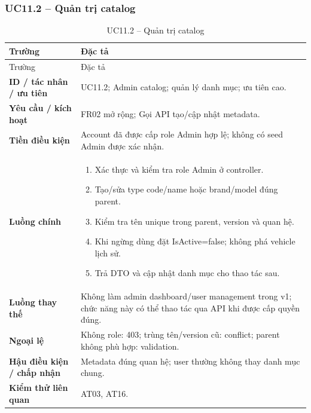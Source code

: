 \subsubsection{UC11.2 -- Quản trị catalog}\label{uc:UC11.2}
\begin{smalltable}\begin{longtable}{L{3.2cm}L{11.8cm}}
\caption{UC11.2 -- Quản trị catalog}\label{tab:UC11.2}\\
\toprule Trường & Đặc tả\\\midrule\endfirsthead
\toprule Trường & Đặc tả\\\midrule\endhead
\textbf{ID / tác nhân / ưu tiên} & UC11.2; Admin catalog; quản lý danh mục; ưu tiên cao.\\
\textbf{Yêu cầu / kích hoạt} & FR02 mở rộng; Gọi API tạo/cập nhật metadata.\\
\textbf{Tiền điều kiện} & Account đã được cấp role Admin hợp lệ; không có seed Admin được xác nhận.\\
\textbf{Luồng chính} & \begin{enumerate}[leftmargin=*,nosep]
\item Xác thực và kiểm tra role Admin ở controller.
\item Tạo/sửa type code/name hoặc brand/model đúng parent.
\item Kiểm tra tên unique trong parent, version và quan hệ.
\item Khi ngừng dùng đặt IsActive=false; không phá vehicle lịch sử.
\item Trả DTO và cập nhật danh mục cho thao tác sau.
\end{enumerate}\\
\textbf{Luồng thay thế} & Không làm admin dashboard/user management trong v1; chức năng này có thể thao tác qua API khi được cấp quyền đúng.\\
\textbf{Ngoại lệ} & Không role: 403; trùng tên/version cũ: conflict; parent không phù hợp: validation.\\
\textbf{Hậu điều kiện / chấp nhận} & Metadata đúng quan hệ; user thường không thay danh mục chung.\\
\textbf{Kiểm thử liên quan} & AT03, AT16.\\
\bottomrule\end{longtable}\end{smalltable}
